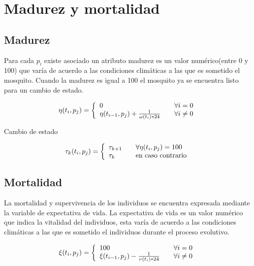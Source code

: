 \section{Madurez y mortalidad}
\subsection{Madurez}
Para cada $p_{i}$ existe asociado un atributo madurez  es
un valor numérico(entre 0 y 100) que varía de acuerdo a las condiciones
climáticas a las que es sometido el mosquito. Cuando la madurez es igual
a 100 el mosquito ya se encuentra listo para un cambio de estado.

\begin{equation}
\eta (t_{i}, p_{j}) = \left\{
  \begin{array}{l l}
    0 & \quad \forall i = 0 \\
    \eta (t_{i-1}, p_{j}) + \frac{1}{\omega(t_{i}) * 24} & \quad \forall i \neq 0
  \end{array} \right.
\end{equation}

Cambio de estado

\begin{equation}
\tau_{k} (t_{i}, p_{j}) = \left\{
  \begin{array}{l l}
    \tau_{k+1} & \quad \forall  \eta(t_{i}, p_{j}) = 100 \\
    \tau_{k} & \quad \text{en caso contrario}
  \end{array} \right.
\end{equation}



\subsection{Mortalidad}
La mortalidad y supervivencia de los individuos se encuentra expresada
mediante la variable de expectativa de vida. La expectativa de vida es
un valor numérico que indica la vitalidad del individuos, esta varía de
acuerdo a las condiciones climáticas a las que es sometido el individuos
durante el proceso evolutivo.

\begin{equation}
\xi (t_{i}, p_{j}) = \left\{
  \begin{array}{l l}
    100 & \quad \forall i = 0 \\
    \xi (t_{i-1}, p_{j}) - \frac{1}{\upsilon(t_{i}) * 24} & \quad \forall i \neq 0
  \end{array} \right.
\end{equation}

